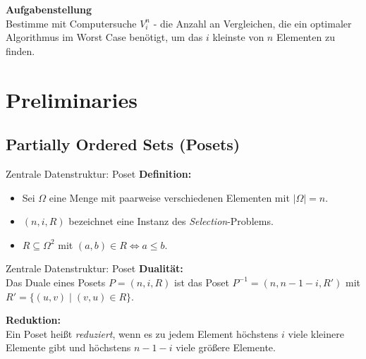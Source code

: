 \begin{frame}{\insertsection}
  \textbf{Aufgabenstellung} \\
  \vspace{5mm}
  Bestimme mit Computersuche $V_i^n$ - die Anzahl an Vergleichen, die ein optimaler Algorithmus im Worst Case benötigt, um das $i$ kleinste von $n$ Elementen zu finden.
\end{frame}


\section{Preliminaries}

\subsection{Partially Ordered Sets (Posets)}

\sectionframe{\insertsection}

\begin{frame}{Zentrale Datenstruktur: Poset}
  \textbf{Definition:}
  \vspace{1mm}
  \begin{itemize}
    \item Sei $\Omega$ eine Menge mit paarweise verschiedenen Elementen mit $\vert \Omega \vert = n$.
    \item $(n,i,R)$ bezeichnet eine Instanz des \textit{Selection}-Problems.
    \item $R \subseteq \Omega^2$ mit $(a,b) \in R \Leftrightarrow a \leq b$.
  \end{itemize}
  \vspace{2mm}
\end{frame}

\begin{frame}{Zentrale Datenstruktur: Poset}
  \textbf{Dualität:} \\
  \vspace{1mm}
  Das Duale eines Posets $P = (n, i, R)$ ist das Poset $P^{-1} = \left(n, n-1-i, R'\right)$ mit $R' = \{ (u,v) \; \vert \; (v,u) \in R\}$.

  \pause
  \vspace{2mm}
  \textbf{Reduktion:} \\
  \vspace{1mm}
  Ein Poset heißt \textit{reduziert}, wenn es zu jedem Element höchstens $i$ viele kleinere Elemente gibt und höchstens $n-1-i$ viele größere Elemente.
\end{frame}

